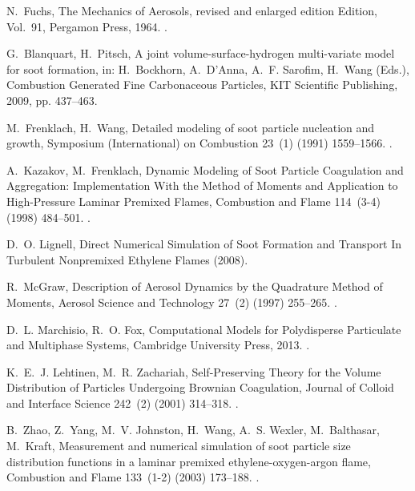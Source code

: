 \documentclass[preprint,letterpaper]{elsarticle}
\begin{document}
\begin{thebibliography}{00}
N.~Fuchs, {The Mechanics of Aerosols}, revised and enlarged edition Edition,
Vol.~91, {Pergamon Press}, 1964.
\newblock \href {http://dx.doi.org/10.1002/qj.49709138822}
  {}.

G.~Blanquart, H.~Pitsch, {A joint volume-surface-hydrogen multi-variate model
for soot formation}, in: H.~Bockhorn, A.~D'Anna, A.~F. Sarofim, H.~Wang
(Eds.), {Combustion Generated Fine Carbonaceous Particles}, {KIT Scientific
Publishing}, 2009, pp. 437--463.

M.~Frenklach, H.~Wang, {Detailed modeling of soot particle nucleation and
growth}, {Symposium (International) on Combustion} 23~(1) (1991) 1559--1566.
\newblock \href {http://dx.doi.org/10.1016/S0082-0784(06)80426-1}
  {}.

A.~Kazakov, M.~Frenklach, {Dynamic Modeling of Soot Particle Coagulation and
Aggregation: Implementation With the Method of Moments and Application to
High-Pressure Laminar Premixed Flames}, {Combustion and Flame} 114~(3-4)
(1998) 484--501.
\newblock \href {http://dx.doi.org/10.1016/S0010-2180(97)00322-2}
  {}.

D.~O. Lignell, {Direct Numerical Simulation of Soot Formation and Transport In
Turbulent Nonpremixed Ethylene Flames} (2008).

R.~McGraw, {Description of Aerosol Dynamics by the Quadrature Method of
Moments}, {Aerosol Science and Technology} 27~(2) (1997) 255--265.
\newblock \href {http://dx.doi.org/10.1080/02786829708965471}
  {}.

D.~L. Marchisio, R.~O. Fox, {Computational Models for Polydisperse Particulate
and Multiphase Systems}, {Cambridge University Press}, 2013.
\newblock \href {http://dx.doi.org/10.1017/CBO9781139016599}
  {}.

K.~E.~J. Lehtinen, M.~R. Zachariah, {Self-Preserving Theory for the Volume
Distribution of Particles Undergoing Brownian Coagulation}, {Journal of
Colloid and Interface Science} 242~(2) (2001) 314--318.
\newblock \href {http://dx.doi.org/10.1006/jcis.2001.7791}
  {}.

B.~Zhao, Z.~Yang, M.~V. Johnston, H.~Wang, A.~S. Wexler, M.~Balthasar,
M.~Kraft, {Measurement and numerical simulation of soot particle size
distribution functions in a laminar premixed ethylene-oxygen-argon flame},
{Combustion and Flame} 133~(1-2) (2003) 173--188.
\newblock \href {http://dx.doi.org/10.1016/S0010-2180(02)00574-6}
  {}.


\end{thebibliography}
\end{document}
